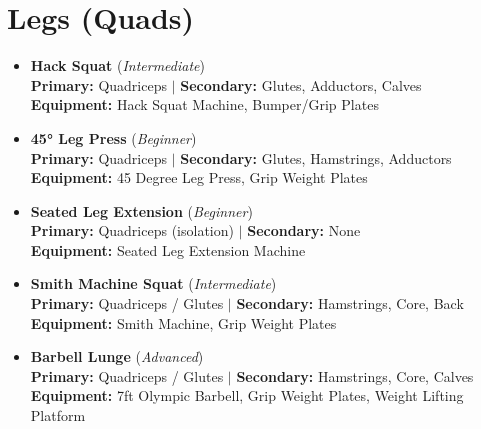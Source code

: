 \documentclass[11pt,a4paper]{article}
\begin{document}
\section*{Legs (Quads)}
\begin{itemize}[leftmargin=*]
  \item \textbf{Hack Squat} (\textit{Intermediate})\\
        \textbf{Primary:} Quadriceps $|$ \textbf{Secondary:} Glutes, Adductors, Calves\\
        \textbf{Equipment:} Hack Squat Machine, Bumper/Grip Plates
  \item \textbf{45° Leg Press} (\textit{Beginner})\\
        \textbf{Primary:} Quadriceps $|$ \textbf{Secondary:} Glutes, Hamstrings, Adductors\\
        \textbf{Equipment:} 45 Degree Leg Press, Grip Weight Plates
  \item \textbf{Seated Leg Extension} (\textit{Beginner})\\
        \textbf{Primary:} Quadriceps (isolation) $|$ \textbf{Secondary:} None\\
        \textbf{Equipment:} Seated Leg Extension Machine
  \item \textbf{Smith Machine Squat} (\textit{Intermediate})\\
        \textbf{Primary:} Quadriceps / Glutes $|$ \textbf{Secondary:} Hamstrings, Core, Back\\
        \textbf{Equipment:} Smith Machine, Grip Weight Plates
  \item \textbf{Barbell Lunge} (\textit{Advanced})\\
        \textbf{Primary:} Quadriceps / Glutes $|$ \textbf{Secondary:} Hamstrings, Core, Calves\\
        \textbf{Equipment:} 7ft Olympic Barbell, Grip Weight Plates, Weight Lifting Platform
\end{itemize}
\vspace{0.5em}
\end{document}
